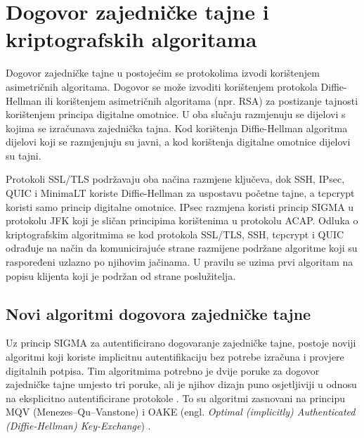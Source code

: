 \section{Dogovor zajedničke tajne i kriptografskih algoritama}

Dogovor zajedničke tajne u postojećim se protokolima izvodi korištenjem
asimetričnih algoritama. Dogovor se može izvoditi korištenjem protokola
Diffie-Hellman ili korištenjem asimetričnih algoritama (npr. RSA) za postizanje
tajnosti korištenjem principa digitalne omotnice. U oba slučaju razmjenuju se
dijelovi s kojima se izračunava zajednička tajna. Kod korištenja Diffie-Hellman
algoritma dijelovi koji se razmjenjuju su javni, a kod korištenja digitalne
omotnice dijelovi su tajni.

Protokoli SSL/TLS podržavaju oba načina razmjene ključeva, dok SSH, IPsec, QUIC i
MinimaLT koriste Diffie-Hellman za uspostavu početne tajne, a  tcpcrypt koristi
samo princip digitalne omotnice. IPsec razmjena koristi princip SIGMA u 
protokolu JFK koji je sličan principima korištenima u protokolu ACAP.
Odluka o kriptografskim algoritmima se kod protokola SSL/TLS, SSH, tcpcrypt i
QUIC odrađuje na način da komunicirajuće strane razmijene podržane algoritme
koji su raspoređeni uzlazno po njihovim jačinama. U pravilu se uzima prvi
algoritam na popisu klijenta koji je podržan od strane poslužitelja.

\subsection{Novi algoritmi dogovora zajedničke tajne}

Uz princip SIGMA za autentificirano dogovaranje zajedničke tajne, postoje noviji
algoritmi koji koriste implicitnu autentifikaciju bez potrebe izračuna i
provjere digitalnih potpisa. Tim algoritmima potrebno je dvije poruke za dogovor
zajedničke tajne umjesto tri poruke, ali je njihov dizajn puno
osjetljiviji u odnosu na eksplicitno autentificirane protokole
\cite{yao2013oake}. To su algoritmi zasnovani na principu MQV
(Menezes–Qu–Vanstone)\cite{law2003efficient} i OAKE (engl. \emph{Optimal
(implicitly) Authenticated (Diffie-Hellman) Key-Exchange}) \cite{yao2013oake}.

